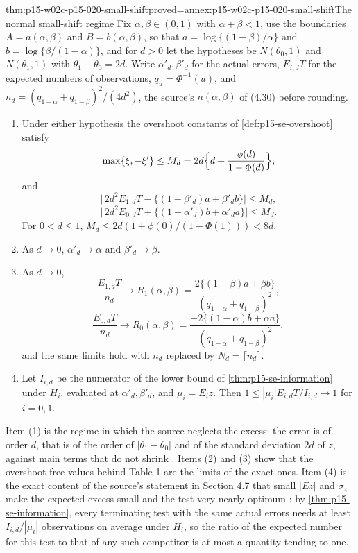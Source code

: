 \begin{hbtheorem}{thm:p15-w02c-p15-020-small-shift}{proved=annex:p15-w02c-p15-020-small-shift}{The normal small-shift regime}
Fix \(\alpha,\beta\in(0,1)\) with \(\alpha+\beta<1\), use the boundaries
\(A=a(\alpha,\beta)\) and \(B=b(\alpha,\beta)\), so that
\(a=\log\{(1-\beta)/\alpha\}\) and \(b=\log\{\beta/(1-\alpha)\}\), and
for \(d>0\) let the hypotheses be \(N(\theta_0,1)\) and \(N(\theta_1,1)\)
with \(\theta_1-\theta_0=2d\). Write \(\alpha'_d,\beta'_d\) for the
actual errors, \(E_{i,d}T\) for the expected numbers of observations,
\(q_u=\Phi^{-1}(u)\), and \(n_d=(q_{1-\alpha}+q_{1-\beta})^2/(4d^2)\),
the source's \(n(\alpha,\beta)\) of (4.30) before rounding.
\begin{enumerate}
\item Under either hypothesis the overshoot constants of
 \cref{def:p15-se-overshoot} satisfy
 \[
  \max\{\xi,-\xi'\}\leq M_d=2d\Bigl\{d+\frac{\phi(d)}{1-\Phi(d)}\Bigr\},
 \]
 and
 \[
  \bigl|\,2d^2E_{1,d}T-\{(1-\beta'_d)a+\beta'_db\}\bigr|\leq M_d,
 \]
 \[
  \bigl|\,2d^2E_{0,d}T+\{(1-\alpha'_d)b+\alpha'_da\}\bigr|\leq M_d .
 \]
 For \(0<d\leq1\), \(M_d\leq2d(1+\phi(0)/(1-\Phi(1)))<8d\).
\item As \(d\to0\), \(\alpha'_d\to\alpha\) and \(\beta'_d\to\beta\).
\item As \(d\to0\),
 \[
  \frac{E_{1,d}T}{n_d}\to R_1(\alpha,\beta)=
  \frac{2\{(1-\beta)a+\beta b\}}{(q_{1-\alpha}+q_{1-\beta})^2},
 \]
 \[
  \frac{E_{0,d}T}{n_d}\to R_0(\alpha,\beta)=
  \frac{-2\{(1-\alpha)b+\alpha a\}}{(q_{1-\alpha}+q_{1-\beta})^2},
 \]
 and the same limits hold with \(n_d\) replaced by
 \(N_d=\lceil n_d\rceil\).
\item Let \(I_{i,d}\) be the numerator of the lower bound of
 \cref{thm:p15-se-information} under \(H_i\), evaluated at
 \(\alpha'_d,\beta'_d\), and \(\mu_i=E_iz\). Then
 \(1\leq|\mu_i|E_{i,d}T/I_{i,d}\to1\) for \(i=0,1\).
\end{enumerate}
Item (1) is the regime in which the source neglects the excess: the
error is of order \(d\), that is of the order of
\(|\theta_1-\theta_0|\) and of the standard deviation \(2d\) of \(z\),
against main terms that do not shrink
\cite[Section 4.1, p.~143; Section 4.3, p.~146]{Wald1945SequentialTests}.
Items (2) and (3) show that the overshoot-free values behind Table 1 are
the limits of the exact ones. Item (4) is the exact content of the
source's statement in Section 4.7 that small \(|Ez|\) and \(\sigma_z\)
make the expected excess small and the test very nearly optimum
\cite[Section 4.7, pp.~154 and 157]{Wald1945SequentialTests}: by
\cref{thm:p15-se-information}, every terminating test with the same
actual errors needs at least \(I_{i,d}/|\mu_i|\) observations on
average under \(H_i\), so the ratio of the expected number for this
test to that of any such competitor is at most a quantity tending to
one.
\end{hbtheorem}

